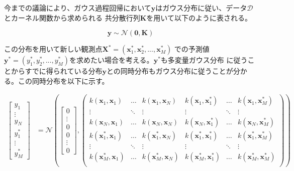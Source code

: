 今までの議論により、ガウス過程回帰において$\boldsymbol{y}$はガウス分布に従い、データ$\mathcal{D}$とカーネル関数から求められる
共分散行列$\boldsymbol{K}$を用いて以下のように表される。

\begin{equation}
\boldsymbol{y} \sim \mathcal{N}(\boldsymbol{0}, \boldsymbol{K})
\end{equation}

この分布を用いて新しい観測点$\boldsymbol{X}^* = (\boldsymbol{x}_{1}^*, \boldsymbol{x}_{2}^*, ..., \boldsymbol{x}_{M}^*)$
での予測値$\boldsymbol{y}^* = (y_{1}^*, y_{2}^*, ..., y_{M}^*)$を求めたい場合を考える。$\boldsymbol{y}^*$も多変量ガウス分布
に従うことからすでに得られている分布$\boldsymbol{y}$との同時分布もガウス分布に従うことが分かる。この同時分布を以下に示す。

\begin{align}
\begin{bmatrix}
	y_{1} \\
	\vdots \\
	y_{N} \\
	y_{1}^* \\
	\vdots \\
	y_{M}^*
\end{bmatrix}
&= \mathcal{N}(
   	\begin{bmatrix}
	  0 \\
	  \vdots \\
	  0 \\
	  0 \\
	  \vdots \\
      0
   	\end{bmatrix},
	\begin{pmatrix}
		k(\boldsymbol{x}_{1}, \boldsymbol{x}_{1}) & \dots & k(\boldsymbol{x}_{1}, \boldsymbol{x}_{N}) & k(\boldsymbol{x}_{1}, \boldsymbol{x}_{1}^*) & \dots & k(\boldsymbol{x}_{1}, \boldsymbol{x}_{M}^*) \\
		\vdots & \ddots & \vdots & \vdots & \ddots & \vdots \\
		k(\boldsymbol{x}_{N}, \boldsymbol{x}_{1}) & \dots & k(\boldsymbol{x}_{N}, \boldsymbol{x}_{N}) & k(\boldsymbol{x}_{N}, \boldsymbol{x}_{1}^*) & \dots & k(\boldsymbol{x}_{N}, \boldsymbol{x}_{M}^*) \\
		k(\boldsymbol{x}_{1}^*, \boldsymbol{x}_{1}) & \dots & k(\boldsymbol{x}_{1}^*, \boldsymbol{x}_{N}) & k(\boldsymbol{x}_{1}^*, \boldsymbol{x}_{1}^*) & \dots & k(\boldsymbol{x}_{1}^*, \boldsymbol{x}_{M}^*) \\
		\vdots & \ddots & \vdots & \vdots & \ddots & \vdots \\
		k(\boldsymbol{x}_{M}^*, \boldsymbol{x}_{1}) & \dots & k(\boldsymbol{x}_{M}^*, \boldsymbol{x}_{N}) & k(\boldsymbol{x}_{M}^*, \boldsymbol{x}_{1}^*) & \dots & k(\boldsymbol{x}_{M}^*, \boldsymbol{x}_{M}^*) \\
    \end{pmatrix}
  )
\end{align}

